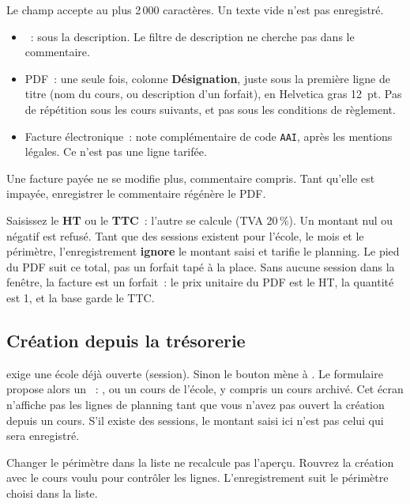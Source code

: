 Le champ  accepte au plus 2\,000 caractères. Un texte vide n'est pas enregistré.

\begin{itemize}[leftmargin=*]
  \item {}~: sous la description. Le filtre de description ne cherche pas dans le commentaire.
  \item PDF~: une seule fois, colonne \textbf{Désignation}, juste sous la première ligne de titre (nom du cours, ou description d'un forfait), en Helvetica gras 12~pt. Pas de répétition sous les cours suivants, et pas sous les conditions de règlement.
  \item Facture électronique~: note complémentaire de code \texttt{AAI}, après les mentions légales. Ce n'est pas une ligne tarifée.
\end{itemize}

Une facture payée ne se modifie plus, commentaire compris. Tant qu'elle est impayée, enregistrer le commentaire régénère le PDF.

\begin{astuce}[HT ou TTC]
  Saisissez le \textbf{HT} ou le \textbf{TTC}~: l'autre se calcule (TVA 20\,\%). Un montant nul ou négatif est refusé.
  Tant que des sessions existent pour l'école, le mois et le périmètre, l'enregistrement \textbf{ignore} le montant saisi et tarifie le planning. Le pied du PDF suit ce total, pas un forfait tapé à la place.
  Sans aucune session dans la fenêtre, la facture est un forfait~: le prix unitaire du PDF est le HT, la quantité est 1, et la base garde le TTC.
\end{astuce}

\subsection{Création depuis la trésorerie}

 exige une école déjà ouverte (session). Sinon le bouton mène à . Le formulaire propose alors un ~: , ou un cours de l'école, y compris un cours archivé. Cet écran n'affiche pas les lignes de planning tant que vous n'avez pas ouvert la création depuis  un cours. S'il existe des sessions, le montant saisi ici n'est pas celui qui sera enregistré.

\begin{astuce}
  Changer le périmètre dans la liste ne recalcule pas l'aperçu. Rouvrez la création avec le cours voulu pour contrôler les lignes. L'enregistrement suit le périmètre choisi dans la liste.
\end{astuce}

